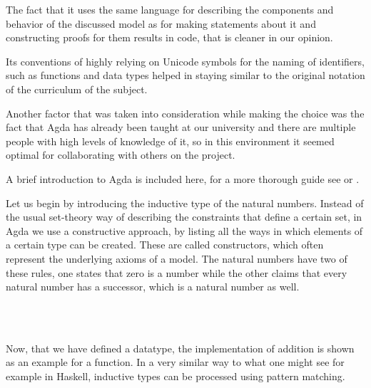 The fact that it uses the same language for describing the components and behavior of the discussed model as for making statements about it and constructing proofs for them results in code, that is cleaner in our opinion.

Its conventions of highly relying on Unicode symbols for the naming of identifiers, such as functions and data types helped in staying similar to the original notation of the curriculum of the subject.

Another factor that was taken into consideration while making the choice was the fact that Agda has already been taught at our university and there are multiple people with high levels of knowledge of it, so in this environment it seemed optimal for collaborating with others on the project.

A brief introduction to Agda is included here, for a more thorough guide see \cite{bove2009brief} or \cite{norell2008dependently}.

Let us begin by introducing the inductive type of the natural numbers. Instead of the usual set-theory way of describing the constraints that define a certain set, in Agda we use a constructive approach, by listing all the ways in which elements of a certain type can be created. These are called constructors, which often represent the underlying axioms of a model. The natural numbers have two of these rules, one states that zero is a number while the other claims that every natural number has a successor, which is a natural number as well.

\begin{code}
    \>[0]\AgdaSpace{}%
    \AgdaSpace{}%
    \AgdaSymbol{:}\AgdaSpace{}%
    \AgdaSpace{}%
    \<%
    \\
    \>[0][@{}l@{\AgdaIndent{0}}]%
    \>[2]\AgdaSpace{}%
    \AgdaSymbol{:}\AgdaSpace{}%
    \<%
    \\
    \>[2]%
    \>[7]\AgdaSymbol{:}\AgdaSpace{}%
    \AgdaSymbol{(}\AgdaSpace{}%
    \AgdaSymbol{:}\AgdaSpace{}%
    \AgdaSymbol{)}\AgdaSpace{}%
    \AgdaSpace{}%
    \<%
\end{code}

Now, that we have defined a datatype, the implementation of addition is shown as an example for a function. In a very similar way to what one might see for example in Haskell, inductive types can be processed using pattern matching.

